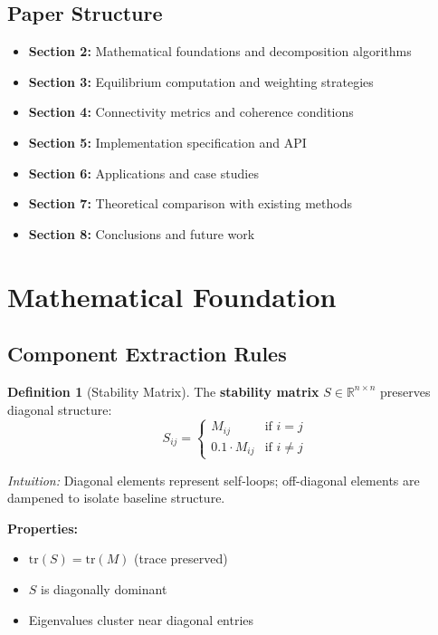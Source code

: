 \documentclass[11pt,a4paper]{article}
\theoremstyle{definition}
\newtheorem{definition}[theorem]{Definition}
\theoremstyle{remark}
\newcommand{\R}{\mathbb{R}}
\newcommand{\trace}{\text{tr}}
\begin{document}
\subsection{Paper Structure}

\begin{itemize}
\item \textbf{Section 2:} Mathematical foundations and decomposition algorithms
\item \textbf{Section 3:} Equilibrium computation and weighting strategies
\item \textbf{Section 4:} Connectivity metrics and coherence conditions
\item \textbf{Section 5:} Implementation specification and API
\item \textbf{Section 6:} Applications and case studies
\item \textbf{Section 7:} Theoretical comparison with existing methods
\item \textbf{Section 8:} Conclusions and future work
\end{itemize}

\section{Mathematical Foundation}

\subsection{Component Extraction Rules}

\begin{definition}[Stability Matrix]\label{def:stability}
The \textbf{stability matrix} $S \in \R^{n \times n}$ preserves diagonal structure:
\begin{equation}
S_{ij} = \begin{cases}
M_{ij} & \text{if } i = j \\
0.1 \cdot M_{ij} & \text{if } i \neq j
\end{cases}
\end{equation}
\end{definition}

\textit{Intuition:} Diagonal elements represent self-loops; off-diagonal elements are dampened to isolate baseline structure.

\textbf{Properties:}
\begin{itemize}
\item $\trace(S) = \trace(M)$ (trace preserved)
\item $S$ is diagonally dominant
\item Eigenvalues cluster near diagonal entries
\end{itemize}
\end{document}
